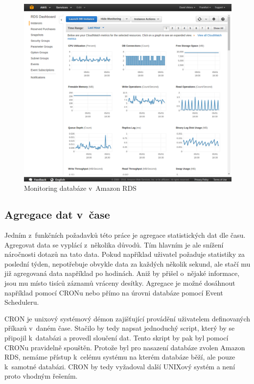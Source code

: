 \documentclass[thesis=B,czech]{FITthesis}[2012/06/26]
\begin{document}
\begin{figure}[h]
   	\centering
   	\includegraphics[width=1\textwidth]{images/aws-monitoring.png}
   	\caption{Monitoring databáze v~Amazon RDS}
   	\label{fig:aws_monitoring}
\end{figure}
	
\subsection{Agregace dat v~čase}
\label{agregace-dat}
	Jedním z~funkčních požadavků této práce je agregace statistických dat dle času. Agregovat data se vyplácí z~několika důvodů. Tím hlavním je ale snížení náročnosti dotazů na tato data. Pokud například uživatel požaduje statistiky za poslední týden, nepotřebuje obvykle data za každých několik sekund, ale stačí mu již agregovaná data například po hodinách. Aniž by přišel o~nějaké informace, jsou mu místo tisíců záznamů vráceny desítky. Agregace je možné dosáhnout například pomocí CRONu nebo přímo na úrovni databáze pomocí Event Scheduleru. 
	
	CRON je unixový systémový démon zajišťující provádění uživatelem definovaných příkazů v~daném čase\cite{cron}. Stačilo by tedy napsat jednoduchý script, který by se připojil k~databázi a provedl sloučení dat. Tento skript by pak byl pomocí CRONu pravidelně spouštěn. Protože byl pro nasazení databáze zvolen Amazon RDS, nemáme přístup k~celému systému na kterém databáze běží, ale pouze k~samotné databázi. CRON by tedy vyžadoval další UNIXový systém a není proto vhodným řešením. 
	
\end{document}
